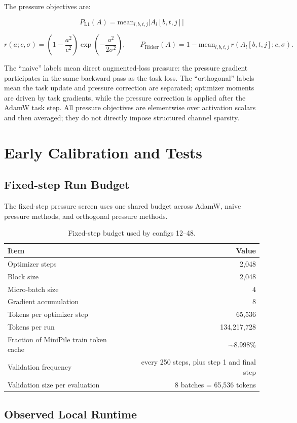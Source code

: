 \documentclass[10pt]{article}
\newcommand{\tightsection}[1]{\section{#1}\vspace{-0.35em}}
\begin{document}
The pressure objectives are:

\[
P_{\mathrm{L1}}(A)=\mathrm{mean}_{l,b,t,j}|A_l[b,t,j]|
\]

\[
r(a;c,\sigma)=\left(1-\frac{a^2}{c^2}\right)\exp\left(-\frac{a^2}{2\sigma^2}\right),
\qquad
P_{\mathrm{Ricker}}(A)=1-\mathrm{mean}_{l,b,t,j}\,r(A_l[b,t,j];c,\sigma).
\]

The ``naive'' labels mean direct augmented-loss pressure: the pressure gradient participates in the same backward pass as the task loss. The ``orthogonal'' labels mean the task update and pressure correction are separated; optimizer moments are driven by task gradients, while the pressure correction is applied after the AdamW task step. All pressure objectives are elementwise over activation scalars and then averaged; they do not directly impose structured channel sparsity.

\tightsection{Early Calibration and Tests}

\subsection*{Fixed-step Run Budget}

The fixed-step pressure screen uses one shared budget across AdamW, naive pressure methods, and orthogonal pressure methods.

\begin{table}[H]
\centering
\caption{Fixed-step budget used by configs 12--48.}
\begin{tabular}{lr}
\toprule
Item & Value \\
\midrule
Optimizer steps & 2,048 \\
Block size & 2,048 \\
Micro-batch size & 4 \\
Gradient accumulation & 8 \\
Tokens per optimizer step & 65,536 \\
Tokens per run & 134,217,728 \\
Fraction of MiniPile train token cache & $\sim$8.998\% \\
Validation frequency & every 250 steps, plus step 1 and final step \\
Validation size per evaluation & 8 batches = 65,536 tokens \\
\bottomrule
\end{tabular}
\end{table}

\subsection*{Observed Local Runtime}
\end{document}
